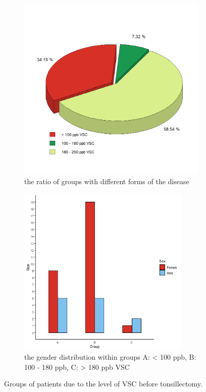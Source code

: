 \documentclass[12pt,a4paper,notitlepage]{report}
\begin{document}
\begin{figure}[hbt!]
	\centering
	\begin{subfigure}[b]{0.85\textwidth}
		\centering
		\includegraphics[width=.8\textwidth, height=.7\textwidth]{./Figures/Fig_2.1a2} 
		\caption{the ratio of groups with different forms of the disease}
		\label{fig:Fig_2.1a}
	\end{subfigure} 
	\vspace*{2cm}
	
	\begin{subfigure}[b]{0.85\textwidth}
		\centering
		\includegraphics[width=0.9\textwidth, height=.7\textwidth]{./Figures/Fig_2.1b2}
		\caption{the gender distribution within groups A: < 100 ppb,  B: 100 - 180 ppb, C: > 180 ppb VSC}
		\label{fig:Fig_2.1b}
	\end{subfigure}
	 
	\caption{Groups of patients due to the level of VSC before tonsillectomy.}
	\label{fig:Fig_2.1}
\end{figure}
\end{document}
